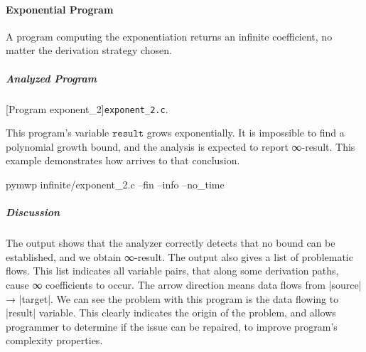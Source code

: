 \paragraph{Exponential Program}\label{exponential-program}
A program computing the exponentiation returns an infinite coefficient, no
matter the derivation strategy chosen.

\subparagraph*{Analyzed Program}

\begin{center}
\begin{minipage}{\textwidth}
\captionsetup{type=lstlisting}
[Program exponent\_2]{\texttt{exponent\_2.c}.}
\label{lst:exponent2}
\end{minipage}
\end{center}

This program's variable \(\texttt{result}\) grows exponentially. It is
impossible to find a polynomial growth bound, and the analysis is expected to
report ∞-result. This example demonstrates how  arrives
to that conclusion.

\begin{center}
\begin{minipage}{\textwidth}
\begin{cmdlisting}[label={lst:ex2-run-cmd}]
pymwp infinite/exponent_2.c --fin --info --no_time
\end{cmdlisting}
\end{minipage}
\end{center}

\begin{center}
\begin{minipage}{\textwidth}
\end{minipage}
\label{lst:ex2-output}
\end{center}

\subparagraph*{Discussion}
The output shows that the analyzer correctly detects that no bound can be
established, and we obtain ∞-result. The output also gives a list
of problematic flows. This list indicates all variable pairs, that along some
derivation paths, cause ∞ coefficients to occur. The arrow
direction means data flows from \pr|source| → \pr|target|. We can see the
problem with this program is the data flowing to \pr|result| variable. This
clearly indicates the origin of the problem, and allows programmer to determine
if the issue can be repaired, to improve program's complexity properties.

